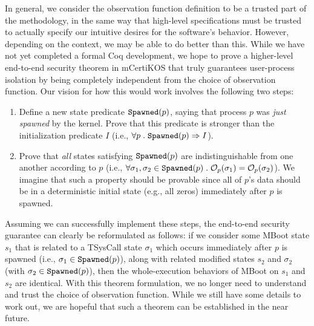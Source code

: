 In general, we consider the observation function definition to
be a trusted part of the methodology, in the same way that high-level
specifications must be trusted to actually specify our intuitive
desires for the software's behavior. However, depending on the
context, we may be able to do better than this. While we have not
yet completed a formal Coq development, we hope to prove a higher-level
end-to-end security theorem in mCertiKOS that truly guarantees 
user-process isolation by being completely independent from the choice 
of observation function. Our vision for how this would work involves
the following two steps:
\begin{enumerate}
\item Define a new state predicate $\text{\tt{Spawned}}(p)$, saying that process
$p$ was \emph{just spawned} by the kernel. Prove that this predicate
is stronger than the initialization predicate $I$ 
(i.e., $\forall p \hspace{1mm} . \hspace{1mm} \text{\tt{Spawned}}(p) \Rightarrow I$).
\item Prove that \emph{all} states satisfying $\text{\tt{Spawned}}(p)$ are
indistinguishable from one another according to $p$
(i.e., $\forall \sigma_1, \sigma_2 \in \text{\tt{Spawned}}(p) \hspace{1mm} . \hspace{1mm} 
\mathcal{O}_{p}(\sigma_1) = \mathcal{O}_{p}(\sigma_2)$). We imagine that
such a property should be provable since all of $p$'s data should
be in a deterministic initial state (e.g., all zeros) immediately 
after $p$ is spawned.
\end{enumerate}
Assuming we can successfully implement these steps, the end-to-end
security guarantee can clearly be reformulated as follows: if we consider
some MBoot state $s_1$ that is related to a TSysCall state $\sigma_1$
which occurs immediately after $p$ is spawned (i.e., $\sigma_1 \in \text{\tt{Spawned}}(p)$), 
along with related modified states $s_2$ and $\sigma_2$ (with
$\sigma_2 \in \text{\tt{Spawned}}(p)$), then the 
whole-execution behaviors of MBoot on $s_1$ and $s_2$ are identical.
With this theorem formulation, we no longer need to understand and
trust the choice of observation function. While we still have some
details to work out, we are hopeful that such a theorem can be 
established in the near future.


